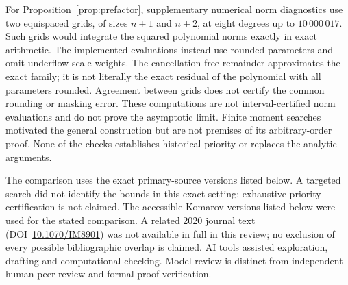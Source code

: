 \documentclass[11pt]{article}
\theoremstyle{remark}\newtheorem{remark}[theorem]{Remark}
\begin{document}
For Proposition~\ref{prop:prefactor}, supplementary numerical norm
diagnostics use two equispaced grids, of sizes \(n+1\) and \(n+2\),
at eight degrees up to \(10\,000\,017\). Such grids would integrate
the squared polynomial norms exactly in exact arithmetic. The
implemented evaluations instead use rounded parameters and omit
underflow-scale weights. The cancellation-free remainder approximates
the exact family; it is not literally the exact residual of the
polynomial with all parameters rounded. Agreement between grids
does not certify the common rounding or masking error.
These computations are not interval-certified norm evaluations and
do not prove the asymptotic limit. Finite moment searches motivated
the general construction but are not premises of its arbitrary-order
proof. None of the checks establishes historical priority or replaces
the analytic arguments.

The comparison uses the exact primary-source versions listed below.
A targeted search did not identify the bounds in this exact setting;
exhaustive priority certification is not claimed. The accessible
Komarov versions listed below were used for the stated comparison.
A related 2020 journal text (DOI~\href{https://doi.org/10.1070/IM8901}{10.1070/IM8901})
was not available in full in this review;
no exclusion of every possible bibliographic overlap is claimed.
AI tools assisted exploration, drafting and computational checking.
Model review is distinct from independent human peer review and
formal proof verification.
\end{document}
